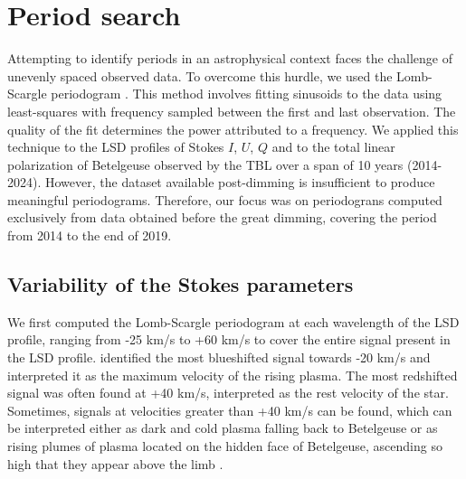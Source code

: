 \documentclass{aa}
\begin{document}

\section{Period search}
\label{section 3}


Attempting to identify periods in an astrophysical context faces the challenge of unevenly spaced observed data. To overcome this hurdle, 
we used the Lomb-Scargle periodogram \citep{lomb_least-squares_1976,scargle_studies_1982}. This method involves fitting sinusoids to the data using least-squares with frequency sampled between the first and last observation. The quality of the fit determines the power attributed to a frequency. We applied this technique to the  LSD profiles of Stokes $I$, $U$, $Q$ and to the total linear polarization of Betelgeuse observed by the TBL over a span of 10 years (2014-2024). However, the dataset available post-dimming is insufficient to produce meaningful periodograms. Therefore, our focus was on periodograns computed exclusively from data obtained before the great dimming, covering the period from 2014 to the end of 2019. 

\subsection{Variability of the Stokes parameters}

We first computed the Lomb-Scargle periodogram at each wavelength of the LSD profile, ranging from -25 km/s to +60 km/s to cover the entire 
signal present in the LSD profile. \cite{lopez_ariste_convective_2018} identified the most blueshifted signal towards -20 km/s and interpreted it as  the maximum velocity of the rising plasma. The most redshifted signal was often found at +40 km/s, interpreted 
as the rest velocity of the star. Sometimes, signals at velocities greater than +40 km/s can be found, which can be interpreted either as dark and cold plasma falling back to Betelgeuse or as rising plumes of plasma located on the hidden face of Betelgeuse, ascending so high that they appear above the limb \citep[for the case of the RSG $\mu$~Cep]{lopez_ariste_height_2023}.





\end{document}

